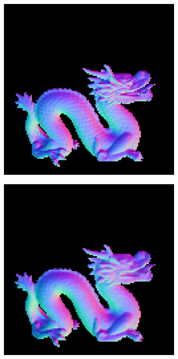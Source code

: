 
\begin{figure}
	\centering
	\begin{subfigure}[b]{0.18\linewidth}
		\includegraphics[width=\linewidth]{./Figures/gcnn_synthetic/fancy_eval_7_groundtruth.png}
	\end{subfigure}
	\begin{subfigure}[b]{0.18\linewidth}
		\includegraphics[width=\linewidth]{./Figures/gcnn_synthetic/fancy_eval_7_normal_f1.png}

\end{subfigure}
\end{figure}

